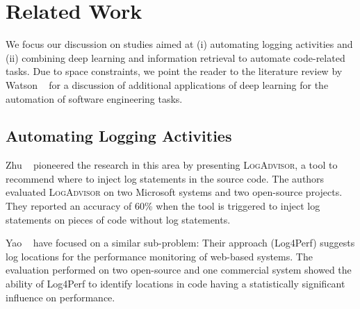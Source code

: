 \section{Related Work} \label{sec:related}

We focus our discussion on studies aimed at (i) automating logging activities and (ii) combining deep learning and information retrieval to automate code-related tasks. Due to space constraints, we point the reader to the literature review by Watson \etal~\cite{watsonSytematicLiterature2020} for a discussion of additional applications of deep learning for the automation of software engineering tasks.

\subsection{Automating Logging Activities}


Zhu \etal~\cite{zhu2015learning} pioneered the research in this area by presenting \textsc{LogAdvisor}, a tool to recommend where to inject log statements in the source code. The authors evaluated \textsc{LogAdvisor} on two Microsoft systems and two open-source projects. They reported an accuracy of 60\% when the tool is triggered to inject log statements on pieces of code without log statements.

Yao \etal~\cite{yao2018log4perf} have focused on a similar sub-problem: Their approach (Log4Perf) suggests log locations for the performance monitoring of web-based systems. The evaluation performed on two open-source and one commercial system showed the ability of Log4Perf to identify locations in code having a statistically significant influence on performance.


